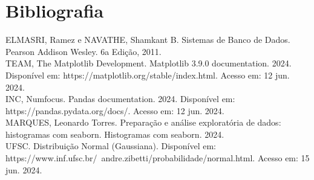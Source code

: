 \documentclass[a4paper, 12pt]{article}
\begin{document}
\section*{Bibliografia}
\footnotesize{

\noindent ELMASRI, Ramez e NAVATHE, Shamkant B. Sistemas de Banco de Dados. Pearson Addison Wesley. 6a Edição, 2011.\\

\noindent TEAM, The Matplotlib Development. Matplotlib 3.9.0 documentation. 2024. Disponível em: https://matplotlib.org/stable/index.html. Acesso em: 12 jun. 2024.\\

\noindent  INC, Numfocus. Pandas documentation. 2024. Disponível em: https://pandas.pydata.org/docs/. Acesso em: 12 jun. 2024. \\

\noindent  MARQUES, Leonardo Torres. Preparação e análise exploratória de dados: histogramas com seaborn. Histogramas com seaborn. 2024. \\

\noindent  UFSC. Distribuição Normal (Gaussiana). Disponível em: https://www.inf.ufsc.br/~andre.zibetti/probabilidade/normal.html. Acesso em: 15 jun. 2024.
\\
}
\end{document}
